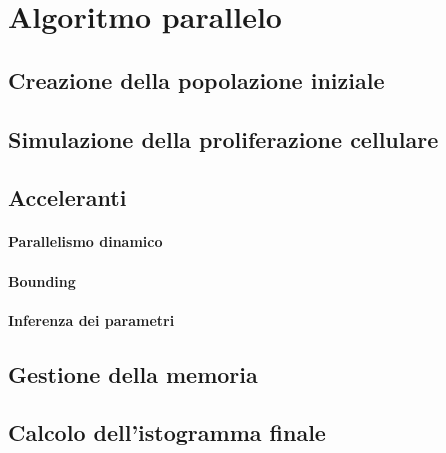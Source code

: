 \section{Algoritmo parallelo}

\subsection{Creazione della popolazione iniziale}

\subsection{Simulazione della proliferazione cellulare}

\subsection{Acceleranti}

\paragraph{Parallelismo dinamico}

\paragraph{Bounding}

\paragraph{Inferenza dei parametri}

\subsection{Gestione della memoria}

\subsection{Calcolo dell'istogramma finale}
